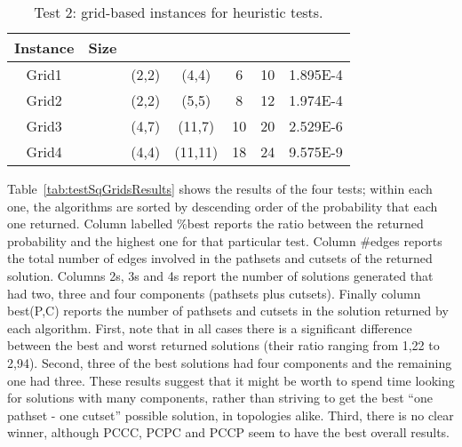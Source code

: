\documentclass[a4paper]{article}
\begin{document}
\begin{table}
\begin{center} \small
\begin{tabular}{ | c | c | c | c | c | c | c | }
\hline
Instance & Size &  &  &  &  &  \\ \hline \hline
Grid1 &  & (2,2) & (4,4) & 6 & 10 & 1.895E-4 \\ \hline
Grid2 &  & (2,2) & (5,5) & 8 & 12 & 1.974E-4 \\ \hline
Grid3 &  & (4,7) & (11,7) & 10 & 20 & 2.529E-6 \\ \hline
Grid4 &  & (4,4) & (11,11) & 18 & 24 & 9.575E-9 \\ \hline
\end{tabular}
\end{center}
\caption{Test 2: grid-based instances for heuristic tests.}
\label{tab:testSqGrids}
\end{table}

Table~\ref{tab:testSqGridsResults} shows the results of the four tests; within each one, the algorithms are sorted by descending order of the probability that each one returned. Column labelled \%\/best reports the ratio between the returned probability and the highest one for that particular test. Column \#edges reports the total number of edges involved in the pathsets and cutsets of the returned solution. Columns 2s, 3s and 4s report the number of solutions generated that had two, three and four components (pathsets plus cutsets). Finally column best(P,C) reports the number of pathsets and cutsets in the solution returned by each algorithm. First, note that in all cases there is a significant difference between the best and worst returned solutions (their ratio ranging from 1,22 to 2,94). Second, three of the best solutions had four components and the remaining one had three. These results suggest that it might be worth to spend time looking for solutions with many components, rather than striving to get the best ``one pathset - one cutset'' possible solution, in topologies alike. Third, there is no clear winner, although PCCC, PCPC and PCCP seem to have the best overall results.  
\end{document}
